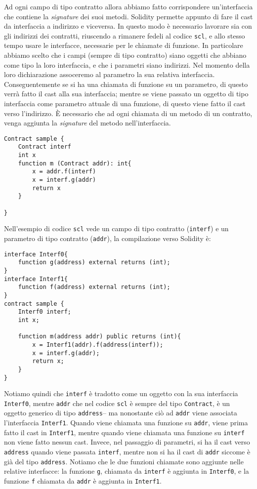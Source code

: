\documentclass[12pt,a4paper]{report}
\begin{document}
Ad ogni campo di tipo contratto allora abbiamo fatto corrispondere
un'interfaccia che contiene la \emph{signature} dei suoi metodi.
Solidity permette appunto di fare il cast da interfaccia a indirizzo e
viceversa. In questo modo è necessario lavorare sia con gli indirizzi
dei contratti, riuscendo a rimanere fedeli al codice \texttt{scl}, e
allo stesso tempo usare le interfacce, necessarie per le chiamate di
funzione. In particolare abbiamo scelto che i campi (sempre di tipo
contratto) siano oggetti che abbiano come tipo la loro interfaccia, e
che i parametri siano indirizzi. Nel momento della loro dichiarazione
assoceremo al parametro la sua relativa interfaccia. Conseguentemente se
si ha una chiamata di funzione su un parametro, di questo verrà fatto il
cast alla sua interfaccia; mentre se viene passato un oggetto di tipo
interfaccia come parametro attuale di una funzione, di questo viene
fatto il cast verso l'indirizzo. È necessario che ad ogni chiamata di un
metodo di un contratto, venga aggiunta la \emph{signature} del metodo
nell'interfaccia.

\begin{verbatim}
Contract sample {
    Contract interf
    int x
    function m (Contract addr): int{
        x = addr.f(interf)
        x = interf.g(addr)
        return x
    }

}
\end{verbatim}

Nell'esempio di codice \texttt{scl} vede un campo di tipo contratto
(\texttt{interf}) e un parametro di tipo contratto (\texttt{addr}), la
compilazione verso Solidity è:

\begin{verbatim}
interface Interf0{
    function g(address) external returns (int);
}
interface Interf1{
    function f(address) external returns (int);
}
contract sample {
    Interf0 interf;
    int x;

    function m(address addr) public returns (int){
        x = Interf1(addr).f(address(interf));
        x = interf.g(addr);
        return x;
    }
}
\end{verbatim}

Notiamo quindi che \texttt{interf} è tradotto come un oggetto con la sua
interfaccia \texttt{Interf0}, mentre \texttt{addr} che nel codice
\texttt{scl} è sempre del tipo \texttt{Contract}, è un oggetto generico
di tipo \texttt{address}-- ma nonostante ciò ad \texttt{addr} viene
associata l'interfaccia \texttt{Interf1}. Quando viene chiamata una
funzione su \texttt{addr}, viene prima fatto il cast in
\texttt{Interf1}, mentre quando viene chiamata una funzione su
\texttt{interf} non viene fatto nessun cast. Invece, nel passaggio di
parametri, si ha il cast verso \texttt{address} quando viene passata
\texttt{interf}, mentre non si ha il cast di \texttt{addr} siccome è già
del tipo \texttt{address}. Notiamo che le due funzioni chiamate sono
aggiunte nelle relative interfacce: la funzione \texttt{g}, chiamata da
\texttt{interf} è aggiunta in \texttt{Interf0}, e la funzione \texttt{f}
chiamata da \texttt{addr} è aggiunta in \texttt{Interf1}.
\end{document}
